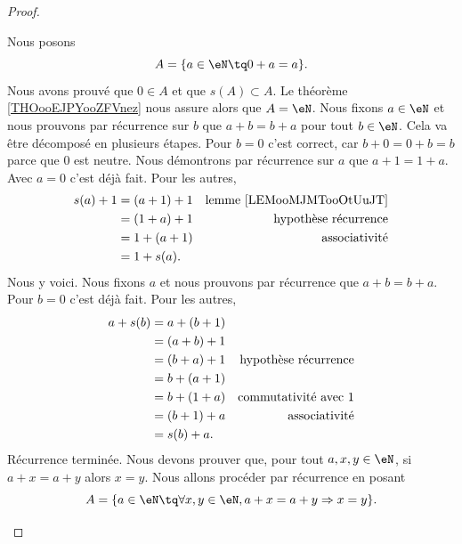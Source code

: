 \begin{proof}
\begin{subproof}
		Nous posons
		\begin{equation}
			A=\{ a\in \eN\tq 0+a=a \}.
		\end{equation}
		Nous avons prouvé que \( 0\in A\) et que \( s(A)\subset A\). Le théorème \ref{THOooEJPYooZFVnez} nous assure alors que \( A=\eN\).
		\spitem[Commutativité]
		Nous fixons \( a\in \eN\) et nous prouvons par récurrence sur \( b\) que \( a+b=b+a\) pour tout \( b\in \eN\). Cela va être décomposé en plusieurs étapes.
		\spitem[\( a+0=0+a\)]
		Pour \( b=0\) c'est correct, car \( b+0=0+b=b\) parce que \( 0\) est neutre.
		\spitem[\( a+1=1+a\)]
		Nous démontrons par récurrence sur \( a\) que \( a+1=1+a\). Avec \( a=0\) c'est déjà fait. Pour les autres,
		\begin{subequations}
			\begin{align}
				s(a)+1 & =(a+1)+1 & \text{lemme \ref{LEMooMJMTooOtUuJT}} \\
				       & =(1+a)+1 & \text{hypothèse récurrence}          \\
				       & =1+(a+1) & \text{associativité}                 \\
				       & =1+s(a).
			\end{align}
		\end{subequations}
		\spitem[\( a+b=b+a\)]
		Nous y voici. Nous fixons \( a\) et nous prouvons par récurrence que \( a+b=b+a\). Pour \( b=0\) c'est déjà fait. Pour les autres,
		\begin{subequations}
			\begin{align}
				a+s(b) & =a+(b+1)                                    \\
				       & =(a+b)+1                                    \\
				       & =(b+a)+1 & \text{hypothèse récurrence}      \\
				       & =b+(a+1)                                    \\
				       & =b+(1+a) & \text{commutativité avec \( 1\)} \\
				       & =(b+1)+a & \text{associativité}             \\
				       & =s(b)+a.
			\end{align}
		\end{subequations}
		Récurrence terminée.
		\spitem[Régularité]
		Nous devons prouver que, pour tout \( a,x,y\in \eN\), si \( a+x=a+y\) alors \( x=y\). Nous allons procéder par récurrence en posant
		\begin{equation}
			A=\{ a\in \eN\tq\forall x,y\in \eN, a+x=a+y\Rightarrow x=y\}.

\end{equation}
\end{subproof}
\end{proof}

